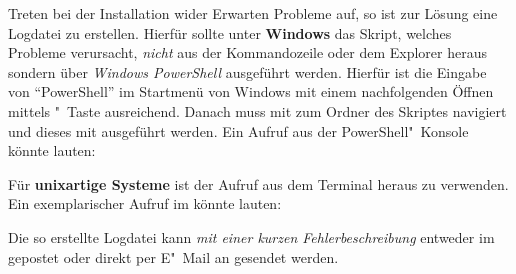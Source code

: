 Treten bei der Installation wider Erwarten Probleme auf, so ist zur Lösung eine 
Logdatei zu erstellen. Hierfür sollte unter \textbf{Windows} das Skript, 
welches Probleme verursacht, \emph{nicht} aus der Kommandozeile oder dem 
Explorer heraus sondern über \emph{Windows PowerShell} ausgeführt werden. 
Hierfür ist die Eingabe von \enquote{PowerShell} im Startmenü von Windows mit 
einem nachfolgenden Öffnen mittels "~Taste ausreichend. 
Danach muss mit  zum Ordner des Skriptes navigiert und dieses mit 
ausgeführt werden. Ein Aufruf aus der PowerShell"~Konsole könnte lauten:
%
\begin{quoting}[rightmargin=0pt]
  \newline%
\end{quoting}
%
Für \textbf{unixartige Systeme} ist der Aufruf  aus dem Terminal heraus zu verwenden. Ein exemplarischer  
Aufruf im könnte lauten:
%
\begin{quoting}
  \newline
\end{quoting}
%
Die so erstellte Logdatei kann \emph{mit einer kurzen Fehlerbeschreibung} 
entweder im \Forum* gepostet oder direkt per E"~Mail an \mailto{\tudscrmail} 
gesendet werden.
%
